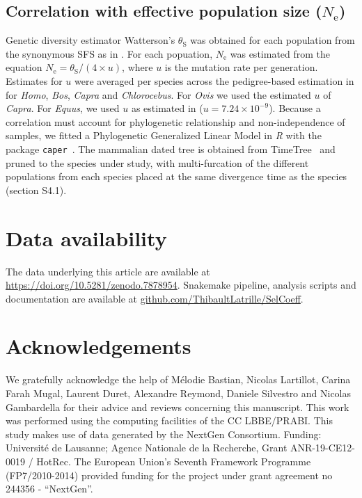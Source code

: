 \documentclass{article}
\newcommand{\Ne}{N_{\text{e}}}
\newcommand{\thetaSyn}{\theta_{\text{S}}}
\begin{document}
    \subsection{Correlation with effective population size ($\Ne$)}
    \label{subsec:correlation-diversity}
    Genetic diversity estimator Watterson's $\thetaSyn$ was obtained for each population from the synonymous SFS as in \textcite{achaz_frequency_2009}.
    For each popuation, $\Ne$ was estimated from the equation $\Ne=\thetaSyn / (4 \times u)$, where $u$ is the mutation rate per generation.
    Estimates for $u$ were averaged per species across the pedigree-based estimation in \textcite{bergeron_evolution_2023} for \textit{Homo}, \textit{Bos}, \textit{Capra} and \textit{Chlorocebus}.
    For \textit{Ovis} we used the estimated $u$ of \textit{Capra}.
    For \textit{Equus}, we used $u$ as estimated in \textcite{orlando_recalibrating_2013} ($u=7.24\times10^{-9}$).
    Because a correlation must account for phylogenetic relationship and non-independence of samples, we fitted a Phylogenetic Generalized Linear Model in \textit{R} with the package \texttt{caper}~\cite{orme_caper_2013}.
    The mammalian dated tree is obtained from TimeTree~\cite{kumar_timetree_2017} and pruned to the species under study, with multi-furcation of the different populations from each species placed at the same divergence time as the species (section S4.1).

    \section*{Data availability}
    The data underlying this article are available at \url{https://doi.org/10.5281/zenodo.7878954}.
    Snakemake pipeline, analysis scripts and documentation are available at \href{https://github.com/ThibaultLatrille/SelCoeff}{github.com/ThibaultLatrille/SelCoeff}.

    \section*{Acknowledgements}
    \label{sec:acknowledgment}
    We gratefully acknowledge the help of Mélodie Bastian, Nicolas Lartillot, Carina Farah Mugal, Laurent Duret, Alexandre Reymond, Daniele Silvestro and Nicolas Gambardella for their advice and reviews concerning this manuscript.
    This work was performed using the computing facilities of the CC LBBE/PRABI\@.
    This study makes use of data generated by the NextGen Consortium.
    Funding:
    Université de Lausanne; Agence Nationale de la Recherche, Grant ANR-19-CE12-0019 / HotRec.
    The European Union’s Seventh Framework Programme (FP7/2010-2014) provided funding for the project under grant agreement no 244356 - “NextGen”.
\end{document}
